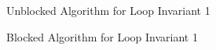 \begin{figure}
	\begin{center}
		\FlaWorksheet
	\end{center}
	\caption{Unblocked Algorithm for Loop Invariant 1}
	\label{fig:unb_inv1}
\end{figure}


\resetsteps



\begin{figure}
	\begin{center}
		\FlaWorksheet
	\end{center}
	\caption{Blocked Algorithm for Loop Invariant 1}
	\label{fig:blk_inv1}
\end{figure}